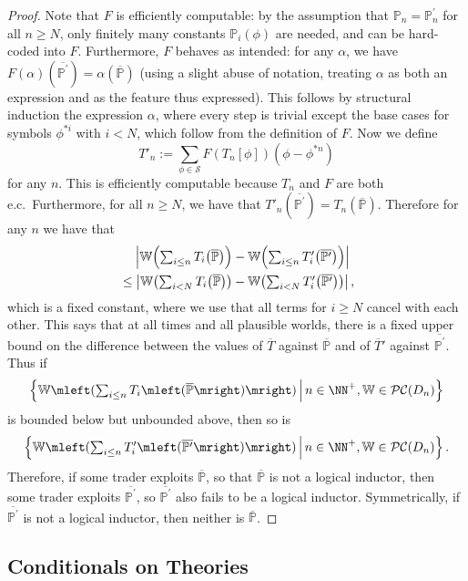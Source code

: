 \documentclass[authordate,onecolumn,noenvironments]{miri-tech-article}
\numberwithin{equation}{subsection}
\newcommand{\seq}[1]{{\overline{#1}}}
\newcommand{\nn}{n}
\newcommand{\ec}[1][\ ]{e.c.#1}
\newcommand{\li}{logical inductor}
\newcommand{\trade}{T}%
\newcommand{\Trader}{\seq{\trade}} %
\newcommand{\BelState}{\mathbb{P}}
\newcommand{\pt}{\BelState}
\newcommand{\MP}{\seq{\pt}}
\newcommand{\dt}{D}
\newcommand{\pcworlds}{\mathcal{P\-C}}
\newcommand{\World}{\mathbb{W}}
\newcommand{\Sentences}{\mathcal{S}}
\begin{document}
\begin{proof}
Note that $F$ is efficiently computable: by the assumption that $ \pt_\nn= \pt^\prime_\nn$ for all $\nn\geq N$, only finitely many constants $\pt_i(\phi)$ are
needed, and can be hard-coded into $F$. Furthermore, $F$ behaves as intended: for any $\alpha$, we have $F(\alpha)({\seq{\pt^\prime}})= \alpha(\MP)$ (using a slight abuse of
notation, treating $\alpha$ as both an expression and as the feature thus expressed). This follows by structural induction
the expression $\alpha$, where every step is trivial except the base cases for symbols $\phi^{* i}$ with $i<N$, which follow from the
definition of $F$. Now we define
%
\[
  \trade'_n := \sum_{\phi \in \Sentences} F(\trade_n[\phi]) (\phi - \phi^{* n}) 
\]
%
for any $n$. This is efficiently computable because $\trade_n$ and $F$ are both \ec  Furthermore, for all $n \ge N$, we have that $\trade'_n({\seq{\pt^\prime}}) =
\trade_n(\MP)$. Therefore for any $n$ we have that 
%
\begin{align*}
&\;\;\;\;\left| 
\World\mleft({\textstyle \sum_{i \leq n} \trade_i\mleft(\MP\mright)}\mright) - 
\World\mleft({\textstyle \sum_{i \leq n} \trade'_i\mleft({\seq{\pt^\prime}}\mright)}\mright) 
\right|\\
&\leq  
\left| 
\World\mleft({\textstyle \sum_{i < N } \trade_i\mleft(\MP\mright)}\mright) - 
\World\mleft({\textstyle \sum_{i < N } \trade'_i\mleft({\seq{\pt^\prime}}\mright)}\mright) 
\right|,
\end{align*}
%
which is a fixed constant, where we use that all terms for $i\ge N$ cancel with each other. This says that at all times and all plausible worlds, there is a
fixed upper bound  on the difference between the values of $\Trader$ against
$\MP$ and of
$\Trader'$ against ${\seq{\pt^\prime}}$. Thus if 
%
\[  \left\{ \World\mleft({\textstyle \sum_{i \leq n} \trade_i\mleft(\MP\mright)}\mright) \,\middle|\, \nn\in\NN^+, \World\in\pcworlds(\dt_\nn)
\right\}\]
%
is bounded below but unbounded above, then so is
%
\[  \left\{ \World\mleft({\textstyle \sum_{i \leq n} \trade'_i\mleft({\seq{\pt^\prime}}\mright)}\mright) \,\middle|\, \nn\in\NN^+, \World\in\pcworlds(\dt_\nn)
\right\}. \]
%
Therefore,
if some trader exploits $\MP$,  so that $\MP$ is not a logical inductor, then some trader exploits ${\seq{\pt^\prime}}$, so ${\seq{\pt^\prime}}$ also fails to be a \li{}. Symmetrically,  if ${\seq{\pt^\prime}}$ is not a \li{},
then neither is $\MP$.
\end{proof}


\subsection{Conditionals on Theories}\label{app:scon}
\end{document}
